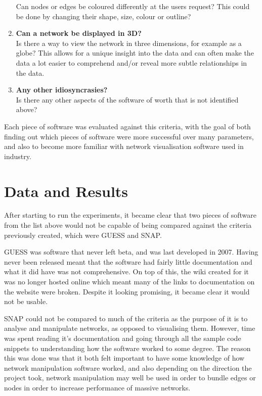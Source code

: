 \documentclass[../dissertation.tex]{subfiles}
\begin{document}
\begin{enumerate}
	Can nodes or edges be coloured differently at the users request? This could be done by changing their shape, size, colour or outline?
	\item \textbf{Can a network be displayed in 3D?}\\
	Is there a way to view the network in three dimensions, for example as a globe? This allows for a unique insight into the data and can often make the data a lot easier to comprehend and/or reveal more subtle relationships in the data.
	\item \textbf{Any other idiosyncrasies?}\\
	Is there any other aspects of the software of worth that is not identified above?
\end{enumerate}

Each piece of software was evaluated against this criteria, with the goal of both finding out which pieces of software were more successful over many parameters, and also to become more familiar with network visualisation software used in industry.

\section{Data and Results}

After starting to run the experiments, it became clear that two pieces of software from the list above would not be capable of being compared against the criteria previously created, which were GUESS and SNAP.

GUESS was software that never left beta, and was last developed in 2007. Having never been released meant that the software had fairly little documentation and what it did have was not comprehensive. On top of this, the wiki created for it was no longer hosted online which meant many of the links to documentation on the website were broken. Despite it looking promising, it became clear it would not be usable.

SNAP could not be compared to much of the criteria as the purpose of it is to analyse and manipulate networks, as opposed to visualising them. However, time was spent reading it’s documentation and going through all the sample code snippets to understanding how the software worked to some degree. The reason this was done was that it both felt important to have some knowledge of how network manipulation software worked, and also depending on the direction the project took, network manipulation may well be used in order to bundle edges or nodes in order to increase performance of massive networks.
\end{document}
